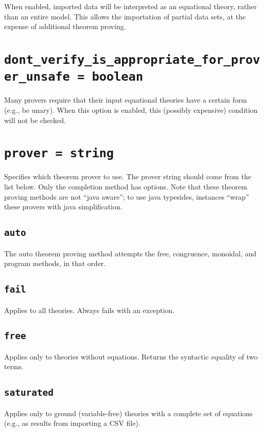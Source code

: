 \documentclass[10pt]{book}
\begin{document}
When enabled, imported data will be interpreted as an equational theory, rather than an entire model.  This allows the importation of partial data sets, at the expense of additional theorem proving.
				
\section{{\tt dont\_verify\_is\_appropriate\_for\_prover\_unsafe = boolean}}
Many provers require that their input equational theories have a certain form (e.g., be unary).  When this option is enabled, this (possibly expensive) condition will not be checked.
				
\section{{\tt prover = string}}
Specifies which theorem prover to use.  The prover string should come from the list below.  Only the completion method has options.  Note that these theorem proving methods are not ``java aware''; to use java typesides, instances ``wrap'' these provers with java simplification.

\subsection{{\tt auto}}

The auto theorem proving method attempts the free, congruence, monoidal, and program methods, in that order.

 \subsection{{\tt fail}}
 
 Applies to all theories.  Always fails with an exception.
 
  \subsection{{\tt free}}
  
  Applies only to theories without equations.  Returns the syntactic equality of two terms.

\subsection{{\tt saturated}}

  Applies only to ground (variable-free) theories with a complete set of equations (e.g., as results from importing a CSV file).
\end{document}
